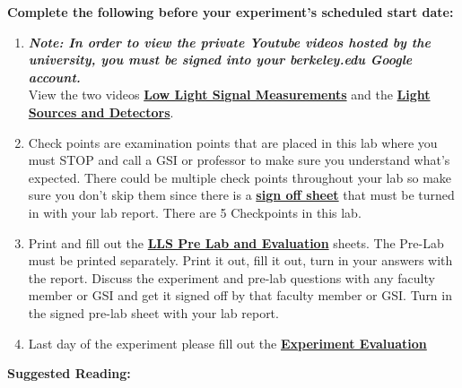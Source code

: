 \documentclass{../lab}
\begin{document}
\textbf{Complete the following before your experiment's scheduled start date:}

\begin{enumerate}
    \item \emph{\textbf{Note: In order to view the private Youtube videos hosted by the university, you must be signed into your berkeley.edu Google account.}}\\
    View the two videos \href{http://youtu.be/X4XQ1jcMuoI}{\textbf{Low Light Signal Measurements}} and the \href{http://youtu.be/lQKLakISoBA}{\textbf{Light Sources and Detectors}}.

    \item Check points are examination points that are placed in this lab where you must STOP and call a GSI or professor to make sure you understand what's expected. There could  be multiple check points throughout your lab so make sure you don't skip them since there is a \href{http://experimentationlab.berkeley.edu/llscheckpoints}{\textbf{sign off sheet}} that must be turned in with your lab report. There are 5 Checkpoints in this lab.

    \item Print and fill out the \href{http://experimentationlab.berkeley.edu/LLSPreLab}{\textbf{LLS Pre Lab and Evaluation}} sheets. The Pre-Lab must be printed separately. Print it out, fill it out, turn in  your answers  with the report. Discuss the experiment and pre-lab questions with any faculty member or GSI and get it signed off by that faculty member or GSI. Turn in the signed pre-lab sheet with your lab report.

    \item Last day of the experiment please fill out the \href{\ExperimentEvaluation}{\textbf{Experiment Evaluation}}

\end{enumerate}

\noindent\textbf{Suggested Reading:}
\end{document}
